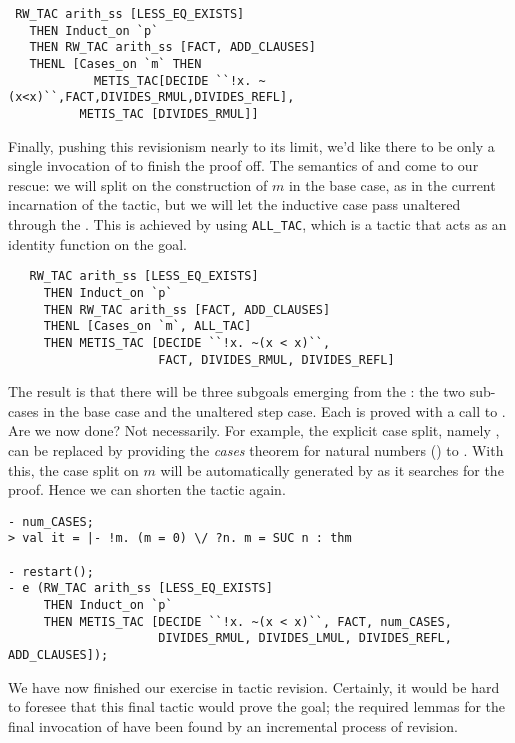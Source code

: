 \begin{hol}
\begin{verbatim}
 RW_TAC arith_ss [LESS_EQ_EXISTS]
   THEN Induct_on `p`
   THEN RW_TAC arith_ss [FACT, ADD_CLAUSES]
   THENL [Cases_on `m` THEN 
            METIS_TAC[DECIDE ``!x. ~(x<x)``,FACT,DIVIDES_RMUL,DIVIDES_REFL],
          METIS_TAC [DIVIDES_RMUL]]
\end{verbatim}
\end{hol}

\noindent
Finally, pushing this revisionism nearly to its limit, we'd
like there to be only a single invocation of  to finish
the proof off. The semantics of  and  come to
our rescue: we will split on the construction of $m$ in the base case,
as in the current incarnation of the tactic, but we will let the
inductive case pass unaltered through the . This is achieved
by using \verb+ALL_TAC+, which is a tactic that acts as an identity
function on the goal.
\begin{hol}
\begin{verbatim}
   RW_TAC arith_ss [LESS_EQ_EXISTS]
     THEN Induct_on `p`
     THEN RW_TAC arith_ss [FACT, ADD_CLAUSES]
     THENL [Cases_on `m`, ALL_TAC]
     THEN METIS_TAC [DECIDE ``!x. ~(x < x)``, 
                     FACT, DIVIDES_RMUL, DIVIDES_REFL]
\end{verbatim}
\end{hol}

\noindent
The result is that there will be three subgoals emerging from the
: the two sub-cases in the base case and the unaltered step
case. Each is proved with a call to . Are we now done?
Not necessarily. For example, the explicit case split, namely ,
can be replaced by providing the \emph{cases} theorem for natural numbers
() to . With this, the case split on $m$ will be 
automatically generated by  as it searches for the proof. Hence we 
can shorten the tactic again.
\begin{session}
\begin{verbatim}
- num_CASES;
> val it = |- !m. (m = 0) \/ ?n. m = SUC n : thm

- restart();
- e (RW_TAC arith_ss [LESS_EQ_EXISTS]
     THEN Induct_on `p`
     THEN METIS_TAC [DECIDE ``!x. ~(x < x)``, FACT, num_CASES,
                     DIVIDES_RMUL, DIVIDES_LMUL, DIVIDES_REFL, ADD_CLAUSES]);
\end{verbatim}
\end{session}
We have now finished our exercise in tactic revision. Certainly, it
would be hard to foresee that this final tactic would prove the
goal; the required lemmas for the final invocation of 
have been found by an incremental process of revision.


